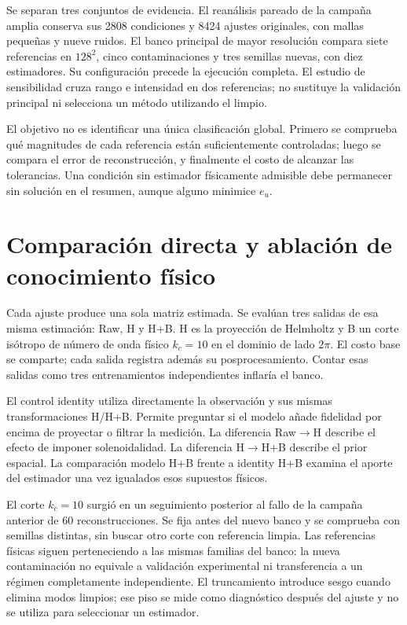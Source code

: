 \documentclass[11pt,oneside,openany]{book}
\begin{document}
Se separan tres conjuntos de evidencia. El reanálisis pareado de la campaña
amplia conserva sus 2808 condiciones y 8424 ajustes originales, con mallas
pequeñas y nueve ruidos. El banco principal de mayor resolución compara siete
referencias en $128^2$, cinco contaminaciones y tres semillas nuevas, con diez
estimadores. Su configuración precede la ejecución completa. El estudio de
sensibilidad cruza rango e intensidad en dos referencias; no sustituye la
validación principal ni selecciona un método utilizando el limpio.

El objetivo no es identificar una única clasificación global. Primero se
comprueba qué magnitudes de cada referencia están suficientemente controladas;
luego se compara el error de reconstrucción, y finalmente el costo de alcanzar
las tolerancias. Una condición sin estimador físicamente admisible debe
permanecer sin solución en el resumen, aunque alguno minimice $e_u$.

\section{Comparación directa y ablación de conocimiento físico}
Cada ajuste produce una sola matriz estimada. Se evalúan tres salidas de esa
misma estimación: Raw, H y H+B. H es la proyección de Helmholtz y B un corte
isótropo de número de onda físico $k_c=10$ en el dominio de lado $2\pi$.
El costo base se comparte; cada salida registra además su posprocesamiento.
Contar esas salidas como tres entrenamientos independientes inflaría el banco.

El control identity utiliza directamente la observación y sus mismas
transformaciones H/H+B. Permite preguntar si el modelo añade fidelidad por
encima de proyectar o filtrar la medición. La diferencia Raw$\to$H describe
el efecto de imponer solenoidalidad. La diferencia H$\to$H+B describe el
prior espacial. La comparación modelo H+B frente a identity H+B examina el
aporte del estimador una vez igualados esos supuestos físicos.

El corte $k_c=10$ surgió en un seguimiento posterior al fallo de la campaña
anterior de 60 reconstrucciones. Se fija antes del nuevo banco y se comprueba
con semillas distintas, sin buscar otro corte con referencia limpia. Las
referencias físicas siguen perteneciendo a las mismas familias del banco:
la nueva contaminación no equivale a validación experimental ni transferencia
a un régimen completamente independiente. El truncamiento introduce sesgo
cuando elimina modos limpios; ese piso se mide como diagnóstico después del
ajuste y no se utiliza para seleccionar un estimador.
\end{document}
